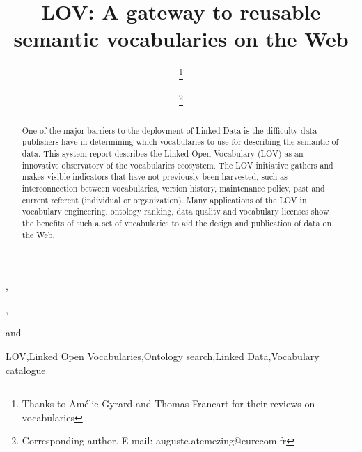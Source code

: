 \documentclass{iosart2c}
\begin{document}
\begin{frontmatter}                        %

%
\title{LOV: A gateway to reusable semantic vocabularies on the Web}




\author[A]{   \thanks{Thanks to Am\'elie Gyrard and Thomas Francart for their reviews on vocabularies}},
\author[B]{ \thanks{Corresponding author. E-mail: auguste.atemezing@eurecom.fr}},
\author[C]{ }
and
\author[D]{ }
\address[A]{Fujitsu (Ireland) Limited, Swords, Co. Dublin, Ireland\\
E-mail: pierre-yves.vandenbussche@ie.fujitsu.com}
\address[B]{Multimedia Communication Department, EURECOM, Campus SophiaTech
450, route des Chappes, 06410 Biot, France\\
E-mail: auguste.atemezing@eurecom.fr}
\address[C]{Ontology Engineering Group (OEG), 
Universidad Polit\'ecnica de Madrid, Madrid, Spain\\
E-mail: mpoveda@fi.upm.es}
\address[D]{Mondeca, 35 boulevard de Strasbourg, 75010 Paris, France
\\
E-mail: bernard.vatant@mondeca.com}


\begin{abstract}
One of the major barriers to the deployment of Linked Data is the difficulty data publishers have in determining which vocabularies to use for describing the semantic of data. This system report describes the Linked Open Vocabulary (LOV) as an innovative observatory of the vocabularies ecosystem. The LOV initiative gathers and makes visible indicators that have not previously been harvested, such as interconnection between vocabularies, version history, maintenance policy, past and current referent (individual or organization). Many applications of the LOV in vocabulary engineering, ontology ranking, data quality and vocabulary licenses show the benefits of such a set of vocabularies to aid the design and publication of data on the Web.
\end{abstract}

\begin{keyword}
LOV\sep Linked Open Vocabularies\sep Ontology search\sep Linked Data\sep Vocabulary catalogue
\end{keyword}

\end{frontmatter}
\end{document}
